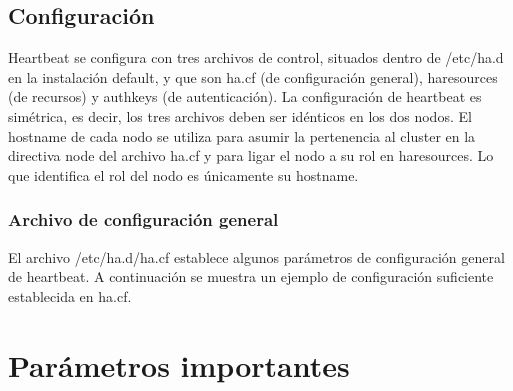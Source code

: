 \subsection{Configuración}
Heartbeat se configura con tres archivos de control, situados dentro de /etc/ha.d en la instalación default, y que son ha.cf (de configuración general), haresources (de recursos) y authkeys (de autenticación). 
La configuración de heartbeat es simétrica, es decir, los tres archivos deben ser idénticos en los dos nodos. El hostname de cada nodo se utiliza para asumir la pertenencia al cluster en la directiva node del archivo ha.cf y para ligar el nodo a su rol en haresources. Lo que identifica el rol del nodo es únicamente su hostname. 

\subsubsection{Archivo de configuración general}
El archivo /etc/ha.d/ha.cf establece algunos parámetros de configuración general de heartbeat. A continuación se muestra un ejemplo de configuración suficiente establecida en ha.cf.




\section{Parámetros importantes}

